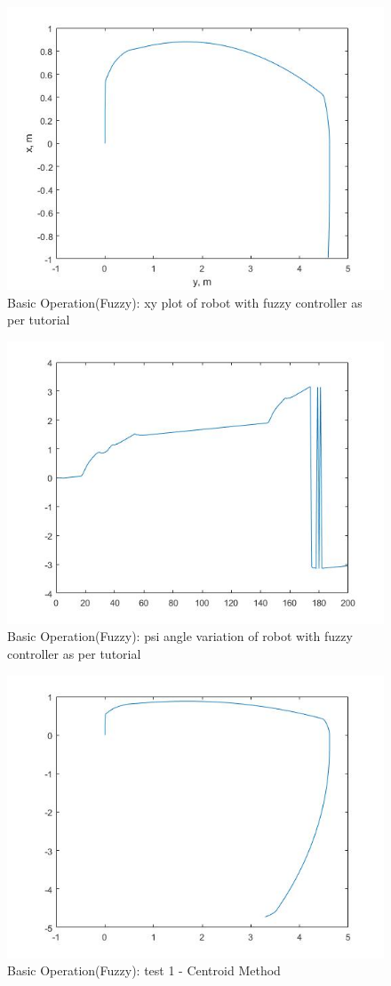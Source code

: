 \documentclass{l4proj}
\begin{document}
\begin{figure}[htb]
    \centering
    \includegraphics[width=0.5\linewidth]{images/initial xy plot.jpg}

    \caption{Basic Operation(Fuzzy): xy plot of robot with fuzzy controller as per tutorial}
    \label{fig:Model1sim4} 
\end{figure}
\begin{figure}[htb]
    \centering
    \includegraphics[width=0.5\linewidth]{images/Initial psi plot.jpg}

    \caption{Basic Operation(Fuzzy): psi angle variation of robot with fuzzy controller as per tutorial}
    \label{fig:Model1sim4} 
\end{figure}
\begin{figure}[htb]
    \centering
    \includegraphics[width=0.5\linewidth]{images/cefig2.jpg}

    \caption{Basic Operation(Fuzzy): test 1 - Centroid Method}
    \label{fig:Model1sim4} 
\end{figure}
\end{document}
